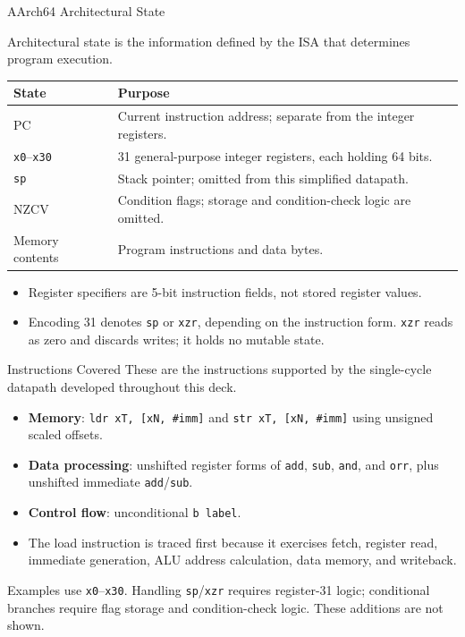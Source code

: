 \documentclass[aspectratio=169,11pt,t]{beamer}
\newcommand{\key}[1]{\textbf{#1}}
\newcommand{\code}[1]{\texttt{#1}}
\begin{document}
\begin{frame}{AArch64 Architectural State}

\small
Architectural state is the information defined by the ISA that determines program execution.
\begin{center}
\renewcommand{\arraystretch}{1.25}
\begin{tabular}{lp{10.3cm}}
\toprule
\rowcolor{white}
\textbf{State} & \textbf{Purpose} \\
\midrule
PC & Current instruction address; separate from the integer registers. \\
\code{x0}--\code{x30} & 31 general-purpose integer registers, each holding 64 bits. \\
\code{sp} & Stack pointer; omitted from this simplified datapath. \\
NZCV & Condition flags; storage and condition-check logic are omitted. \\
Memory contents & Program instructions and data bytes. \\
\bottomrule
\end{tabular}
\end{center}
\begin{itemize}\setlength{\itemsep}{4pt}
\item Register specifiers are 5-bit instruction fields, not stored register values.
\item Encoding 31 denotes \code{sp} or \code{xzr}, depending on the instruction form. \code{xzr} reads as zero and discards writes; it holds no mutable state.
\end{itemize}

\end{frame}

\begin{frame}{Instructions Covered}
\normalsize
These are the instructions supported by the single-cycle datapath developed throughout this deck.
\vspace{.15cm}
\begin{itemize}\setlength{\itemsep}{7pt}
  \item \key{Memory}: \code{ldr xT, [xN, \#imm]} and \code{str xT, [xN, \#imm]} using unsigned scaled offsets.
  \item \key{Data processing}: unshifted register forms of \code{add}, \code{sub}, \code{and}, and \code{orr}, plus unshifted immediate \code{add}/\code{sub}.
  \item \key{Control flow}: unconditional \code{b label}.
  \item The load instruction is traced first because it exercises fetch, register read, immediate generation, ALU address calculation, data memory, and writeback.
\end{itemize}
\vspace{0.15cm}
\small
Examples use \code{x0}--\code{x30}. Handling \code{sp}/\code{xzr} requires register-31 logic; conditional branches require flag storage and condition-check logic. These additions are not shown.
\end{frame}
\end{document}
